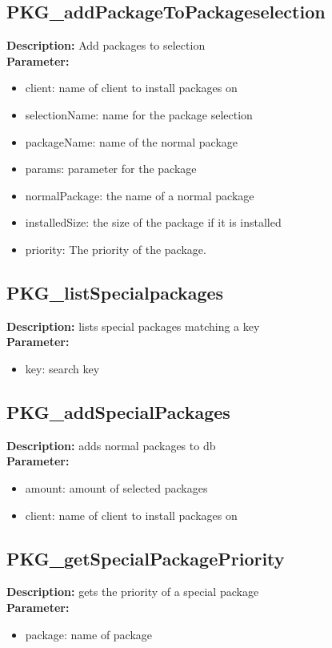 \subsection{PKG\_addPackageToPackageselection}
\textbf{Description:} Add packages to selection\\
\textbf{Parameter:}
\begin{itemize}
\item client: name of client to install packages on
\item selectionName: name for the package selection
\item packageName: name of the normal package
\item params: parameter for the package
\item normalPackage: the name of a normal package
\item installedSize: the size of the package if it is installed
\item priority: The priority of the package.
\end{itemize}

\subsection{PKG\_listSpecialpackages}
\textbf{Description:} lists special packages matching a key\\
\textbf{Parameter:}
\begin{itemize}
\item key: search key
\end{itemize}

\subsection{PKG\_addSpecialPackages}
\textbf{Description:} adds normal packages to db\\
\textbf{Parameter:}
\begin{itemize}
\item amount: amount of selected packages
\item client: name of client to install packages on
\end{itemize}

\subsection{PKG\_getSpecialPackagePriority}
\textbf{Description:} gets the priority of a special package\\
\textbf{Parameter:}
\begin{itemize}
\item package: name of package
\end{itemize}

